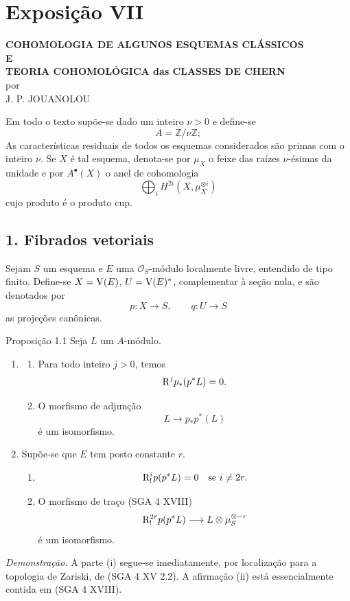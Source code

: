 \section*{Exposição VII}

\begin{center}
\textbf{COHOMOLOGIA DE ALGUNOS ESQUEMAS CLÁSSICOS}\\[0.5em]
\textbf{E}\\[0.5em]
\textbf{TEORIA COHOMOLÓGICA das CLASSES DE CHERN}\\[1em]
por\\[0.5em]
J. P. JOUANOLOU
\end{center}

Em todo o texto supõe-se dado um inteiro $\nu>0$ e define-se
\[
A=\mathbb Z/\nu\mathbb Z;
\]
As características residuais de todos os esquemas considerados são primas com o inteiro $\nu$. Se $X$ é tal esquema, denota-se por $\mu_X$ o feixe das raízes $\nu$-ésimas da unidade e por $A^{\bullet}(X)$ o anel de cohomologia
\[
\bigoplus_i H^{2i}(X,\mu_X^{\otimes i})
\]
cujo produto é o produto cup.

\subsection*{1. Fibrados vetoriais}

Sejam $S$ um esquema e $E$ uma $\mathcal O_S$-módulo localmente livre, entendido de tipo finito. Define-se $X=\mathrm V(E)$, $U=\mathrm V(E)^*$, complementar à seção nula, e são denotados por
\[
p:X\to S,
\qquad
q:U\to S
\]
as projeções canônicas.

\begin{statement}{Proposição 1.1}
Seja $L$ um $A$-módulo.
\begin{enumerate}[label=(\roman*)]
\item
\begin{enumerate}[label=\alph*)]
\item Para todo inteiro $j>0$, temos
\[
\mathrm{R}^j p_*(p^*L)=0.
\]
\item O morfismo de adjunção
\[
L\longrightarrow p_*p^*(L)
\]
é um isomorfismo.
\end{enumerate}
\item Supõe-se que $E$ tem posto constante $r$.
\begin{enumerate}[label=\alph*)]
\item
\[
\mathrm{R}_!^i p(p^*L)=0\quad\text{se }i\ne 2r.
\]
\item O morfismo de traço (SGA 4 XVIII)
\[
\mathrm{R}_!^{2r}p(p^*L)\longrightarrow L\otimes\mu_S^{\otimes -r}
\]
é um isomorfismo.
\end{enumerate}
\end{enumerate}
\end{statement}

\emph{Demonstração.} A parte (i) segue-se imediatamente, por localização para a topologia de Zariski, de (SGA 4 XV 2.2). A afirmação (ii) está essencialmente contida em (SGA 4 XVIII).
